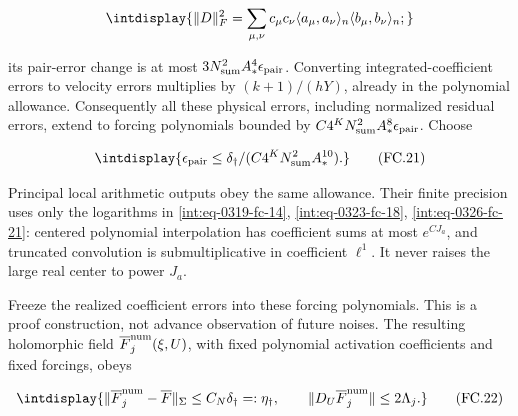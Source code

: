 \begingroup\renewcommand{\theHequation}{intdisplay.719}
\begin{equation*}
\intdisplay{
\|D\|_F^2=\sum_{\mu,\nu}c_\mu c_\nu
\langle a_\mu,a_\nu\rangle_n\langle b_\mu,b_\nu\rangle_n;
}
\end{equation*}
\endgroup


its pair-error change is at most \(3N_{\rm sum}^2A_\ast^4\epsilon_{\rm pair}\). Converting integrated-coefficient errors to velocity errors multiplies by \((k+1)/(hY)\), already in the polynomial allowance. Consequently all these physical errors, including normalized residual errors, extend to forcing polynomials bounded by \(C4^KN_{\rm sum}^2A_\ast^8\epsilon_{\rm pair}\). Choose


\begingroup\renewcommand{\theHequation}{intdisplay.720}
\begin{equation}
\intdisplay{
\epsilon_{\rm pair}\le
\delta_\dagger/(C4^KN_{\rm sum}^2A_\ast^{10}).
}
\tag{FC.21}
\label{int:eq-0326-fc-21}
\end{equation}
\endgroup


Principal local arithmetic outputs obey the same allowance. Their finite precision uses only the logarithms in \eqref{int:eq-0319-fc-14}, \eqref{int:eq-0323-fc-18}, \eqref{int:eq-0326-fc-21}: centered polynomial interpolation has coefficient sums at most \(e^{CJ_a}\), and truncated convolution is submultiplicative in coefficient \(\ell^1\). It never raises the large real center to power \(J_a\).



Freeze the realized coefficient errors into these forcing polynomials. This is a proof construction, not advance observation of future noises. The resulting holomorphic field \(\overline F_j^{\rm num}(\xi,\allowbreak U)\), with fixed polynomial activation coefficients and fixed forcings, obeys


\begingroup\renewcommand{\theHequation}{intdisplay.721}
\begin{equation}
\intdisplay{
\|\overline F_j^{\rm num}-\overline F\|_\Sigma
\le C_N\delta_\dagger=:\eta_\dagger,\qquad
\|D_U\overline F_j^{\rm num}\|\le2\Lambda_j.
}
\tag{FC.22}
\label{int:eq-0327-fc-22}
\end{equation}
\endgroup


